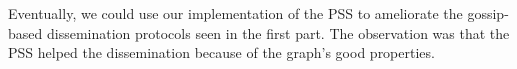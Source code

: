 \documentclass[a4paper, 11pt]{article}
\theoremstyle{plain}
\theoremstyle{definition}
\begin{document}
  Eventually, we could use our implementation of the PSS to ameliorate the gossip-based dissemination
  protocols seen in the first part. The observation was that the PSS helped the dissemination because of the
  graph's good properties.












	
\end{document}

